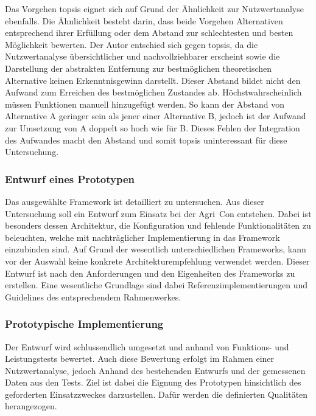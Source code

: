 Das Vorgehen \Gls{topsis} eignet sich auf Grund der Ähnlichkeit zur Nutzwertanalyse ebenfalls.
Die Ähnlichkeit besteht darin, dass beide Vorgehen Alternativen entsprechend ihrer Erfüllung oder dem Abstand zur schlechtesten und besten Möglichkeit bewerten.
Der Autor entschied sich gegen \Gls{topsis}, da die Nutzwertanalyse übersichtlicher und nachvollziehbarer erscheint sowie die Darstellung der abstrakten Entfernung zur bestmöglichen theoretischen Alternative keinen Erkenntnisgewinn darstellt.
Dieser Abstand bildet nicht den Aufwand zum Erreichen des bestmöglichen Zustandes ab. Höchstwahrscheinlich müssen Funktionen manuell hinzugefügt werden. So kann der Abstand von Alternative A geringer sein als jener einer Alternative B, jedoch ist der Aufwand zur Umsetzung von A doppelt so hoch wie für B.
Dieses Fehlen der Integration des Aufwandes macht den Abstand und somit \Gls{topsis} uninteressant für diese Untersuchung.

\subsubsection{Entwurf eines Prototypen}
Das ausgewählte Framework ist detailliert zu untersuchen.
Aus dieser Untersuchung soll ein Entwurf zum Einsatz bei der Agri~Con entstehen.
Dabei ist besonders dessen Architektur, die Konfiguration und fehlende Funktionalitäten zu beleuchten, welche mit nachträglicher Implementierung in das Framework einzubinden sind.
Auf Grund der wesentlich unterschiedlichen Frameworks, kann vor der Auswahl keine konkrete Architekturempfehlung verwendet werden. Dieser Entwurf ist nach den Anforderungen und den Eigenheiten des Frameworks zu erstellen. Eine wesentliche Grundlage sind dabei Referenzimplementierungen und Guidelines des entsprechendem Rahmenwerkes.

\subsubsection{Prototypische Implementierung}
Der Entwurf wird schlussendlich umgesetzt und anhand von Funktions- und Leistungstests bewertet.
Auch diese Bewertung erfolgt im Rahmen einer Nutzwertanalyse, jedoch Anhand des bestehenden Entwurfs und der gemessenen Daten aus den Tests.
Ziel ist dabei die Eignung des Prototypen hinsichtlich des geforderten Einsatzzweckes darzustellen.
Dafür werden die definierten Qualitäten herangezogen.

